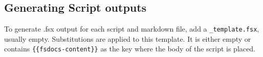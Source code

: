\documentclass{article}
\begin{document}
\subsection*{Generating Script outputs}



To generate .fsx output for each script and markdown file, add a \texttt{\_template.fsx}, usually empty. Substitutions are
applied to this template. It is either empty or contains \texttt{\{\{fsdocs-content\}\}} as the key where the body
of the script is placed.
\end{document}
